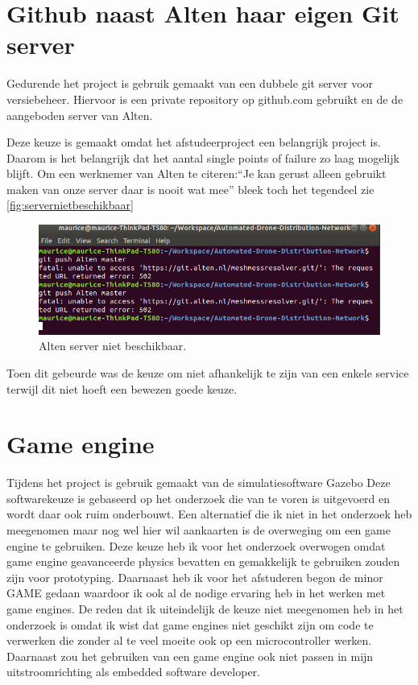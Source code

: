 \documentclass[a4paper, 11pt, oneside]{report}
\begin{document}
\section{Github naast Alten haar eigen Git server}

Gedurende het project is gebruik gemaakt van een dubbele git server voor versiebeheer.
Hiervoor is een private repository op github.com gebruikt en de de aangeboden server van Alten.

Deze keuze is gemaakt omdat het afstudeerproject een belangrijk project is. 
Daarom is het belangrijk dat het aantal single points of failure zo laag mogelijk blijft.
Om een werknemer van Alten te citeren:``Je kan gerust alleen gebruikt maken van onze server daar is nooit wat mee'' bleek toch het tegendeel zie \autoref{fig:servernietbeschikbaar}

\begin{figure}[H]
	\begin{center}\includegraphics[width=0.61\linewidth]{Afbeeldingen/AltenGit.png}\end{center}
	\caption{Alten server niet beschikbaar.}
	\label{fig:servernietbeschikbaar}
\end{figure}

Toen dit gebeurde was de keuze om niet afhankelijk te zijn van een enkele service terwijl dit niet hoeft een bewezen goede keuze.

\section{Game engine}

Tijdens het project is gebruik gemaakt van de simulatiesoftware Gazebo
Deze softwarekeuze is gebaseerd op het onderzoek die van te voren is uitgevoerd en wordt daar ook ruim onderbouwt.
Een alternatief die ik niet in het onderzoek heb meegenomen maar nog wel hier wil aankaarten is de overweging om een game engine te gebruiken.
Deze keuze heb ik voor het onderzoek overwogen omdat game engine geavanceerde physics bevatten en gemakkelijk te gebruiken zouden zijn voor prototyping.
Daarnaast heb ik voor het afstuderen begon de minor GAME gedaan waardoor ik ook al de nodige ervaring heb in het werken met game engines.
De reden dat ik uiteindelijk de keuze niet meegenomen heb in het onderzoek is omdat ik wist dat game engines niet geschikt zijn om code te verwerken die zonder al te veel moeite ook op een microcontroller werken.
Daarnaast zou het gebruiken van een game engine ook niet passen in mijn uitstroomrichting als embedded software developer.
\end{document}
